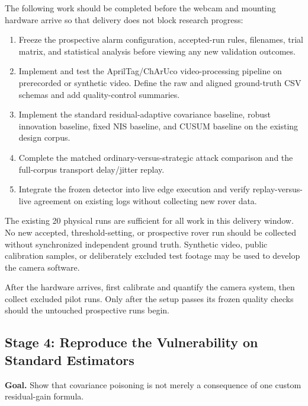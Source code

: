 \documentclass[11pt,a4paper]{article}
\begin{document}
The following work should be completed before the webcam and mounting hardware
arrive so that delivery does not block research progress:

\begin{enumerate}
    \item Freeze the prospective alarm configuration, accepted-run rules,
    filenames, trial matrix, and statistical analysis before viewing any new
    validation outcomes.

    \item Implement and test the AprilTag/ChArUco video-processing pipeline on
    prerecorded or synthetic video. Define the raw and aligned ground-truth CSV
    schemas and add quality-control summaries.

    \item Implement the standard residual-adaptive covariance baseline, robust
    innovation baseline, fixed NIS baseline, and CUSUM baseline on the existing
    design corpus.

    \item Complete the matched ordinary-versus-strategic attack comparison and
    the full-corpus transport delay/jitter replay.

    \item Integrate the frozen detector into live edge execution and verify
    replay-versus-live agreement on existing logs without collecting new rover
    data.
\end{enumerate}

The existing 20 physical runs are sufficient for all work in this delivery
window. No new accepted, threshold-setting, or prospective rover run should be
collected without synchronized independent ground truth. Synthetic video,
public calibration samples, or deliberately excluded test footage may be used
to develop the camera software.

After the hardware arrives, first calibrate and quantify the camera system,
then collect excluded pilot runs. Only after the setup passes its frozen
quality checks should the untouched prospective runs begin.

\subsection{Stage 4: Reproduce the Vulnerability on Standard Estimators}

\textbf{Goal.} Show that covariance poisoning is not merely a consequence of
one custom residual-gain formula.
\end{document}
